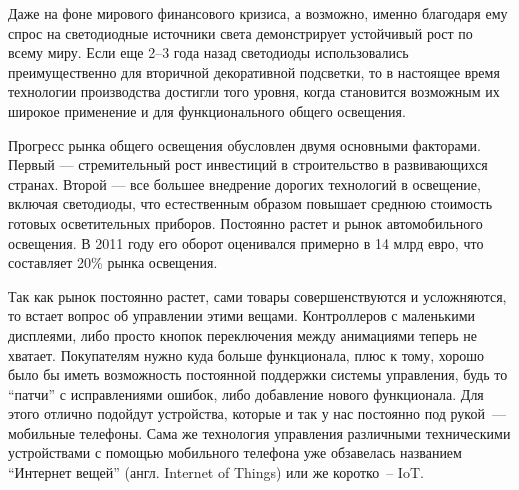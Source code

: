 Даже на фоне мирового финансового кризиса, а возможно, именно благодаря ему спрос на светодиодные источники света демонстрирует устойчивый рост по всему миру. Если еще 2–3 года назад светодиоды использовались преимущественно для вторичной декоративной подсветки, то в настоящее время технологии производства достигли того уровня, когда становится возможным их широкое применение и для функционального общего освещения.

Прогресс рынка общего освещения обусловлен двумя основными факторами. Первый — стремительный рост инвестиций в строительство в развивающихся странах. Второй — все большее внедрение дорогих технологий в освещение, включая светодиоды, что естественным образом повышает среднюю стоимость готовых осветительных приборов. Постоянно растет и рынок автомобильного освещения. В 2011 году его оборот оценивался примерно в 14 млрд евро, что составляет 20\% рынка освещения.

Так как рынок постоянно растет, сами товары совершенствуются и усложняются, то встает вопрос об управлении этими вещами. Контроллеров с маленькими дисплеями, либо просто кнопок переключения между анимациями теперь не хватает. Покупателям нужно куда больше функционала, плюс к тому, хорошо было бы иметь возможность постоянной поддержки системы управления, будь то ``патчи'' с исправлениями ошибок, либо добавление нового функционала. Для этого отлично подойдут устройства, которые и так у нас постоянно под рукой~--- мобильные телефоны. Сама же технология управления различными техническими устройствами с помощью мобильного телефона уже обзавелась названием ``Интернет вещей'' (англ. Internet of Things) или же коротко~-- IoT.